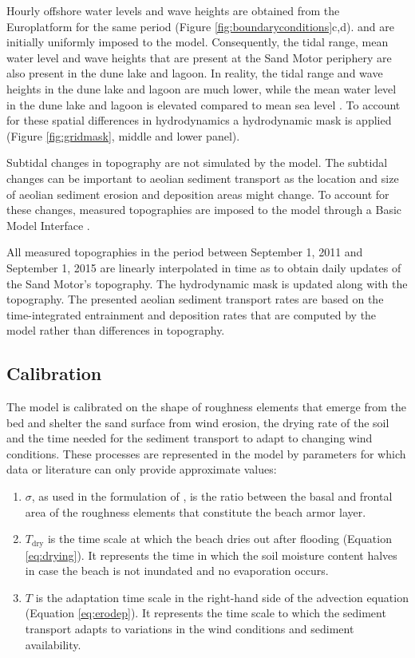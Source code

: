\documentclass[preprint,12pt,authoryear]{elsarticle}
\begin{document}
Hourly offshore water levels and wave heights are obtained from the
Europlatform for the same period (Figure
\ref{fig:boundaryconditions}c,d).  and are initially uniformly imposed
to the model. Consequently, the tidal range, mean water level and wave
heights that are present at the Sand Motor periphery are also present
in the dune lake and lagoon. In reality, the tidal range and wave
heights in the dune lake and lagoon are much lower, while the mean
water level in the dune lake and lagoon is elevated compared to mean
sea level \citep{deVries2015}. To account for these spatial
differences in hydrodynamics a hydrodynamic mask is applied (Figure
\ref{fig:gridmask}, middle and lower panel).

Subtidal changes in topography are not simulated by the model. The
subtidal changes can be important to aeolian sediment transport as the
location and size of aeolian sediment erosion and deposition areas
might change. To account for these changes, measured topographies are
imposed to the model through a Basic Model Interface
\citep[BMI,][]{Peckham2013}.

All measured topographies in the period between September 1, 2011 and
September 1, 2015 are linearly interpolated in time as to obtain daily
updates of the Sand Motor's topography. The hydrodynamic mask is
updated along with the topography. The presented aeolian sediment
transport rates are based on the time-integrated entrainment and
deposition rates that are computed by the model rather than
differences in topography.

\subsection{Calibration}

The model is calibrated on the shape of roughness elements that emerge
from the bed and shelter the sand surface from wind erosion, the
drying rate of the soil and the time needed for the sediment transport
to adapt to changing wind conditions. These processes are represented
in the model by parameters for which data or literature can only
provide approximate values:

\begin{enumerate}
\item $\sigma$, as used in the formulation of \citet[][Equation
  \ref{eq:raupach}]{Raupach1993}, is the ratio between the basal and
  frontal area of the roughness elements that constitute the beach
  armor layer.
\item $T_{\mathrm{dry}}$ is the time scale at which the beach dries
  out after flooding (Equation \ref{eq:drying}). It represents the
  time in which the soil moisture content halves in case the beach is
  not inundated and no evaporation occurs.
\item $T$ is the adaptation time scale in the right-hand side of the
  advection equation (Equation \ref{eq:erodep}). It represents the
  time scale to which the sediment transport adapts to variations in
  the wind conditions and sediment availability.
\end{enumerate}
\end{document}
